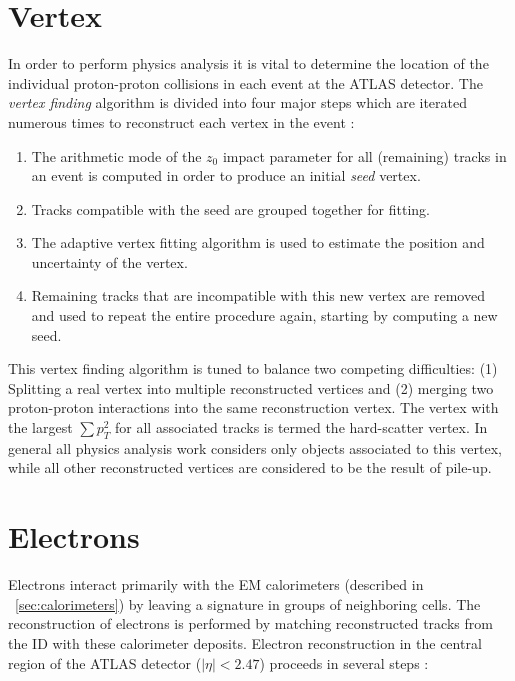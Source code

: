 \section{Vertex}
In order to perform physics analysis it is vital to determine the location of the individual proton-proton collisions in each event at the ATLAS detector.
The \textit{vertex finding} algorithm is divided into four major steps which are iterated numerous times to reconstruct each vertex in the event  \cite{Borissov:2015djv}:
\begin{enumerate}
    \item 
        The arithmetic mode of the $z_0$ impact parameter for all (remaining) tracks in an event is computed in order to produce an initial \textit{seed} vertex.
    \item 
        Tracks compatible with the seed are grouped together for fitting.
    \item 
        The adaptive vertex fitting algorithm is used to estimate the position and uncertainty of the vertex.
    \item
        Remaining tracks that are incompatible with this new vertex are removed and used to repeat the entire procedure again, starting by computing a new seed.
\end{enumerate}
This vertex finding algorithm is tuned to balance two competing difficulties: (1) Splitting a real vertex into multiple reconstructed vertices and (2) merging two proton-proton interactions into the same reconstruction vertex. 
The vertex with the largest $\sum p_T^2$ for all associated tracks is termed the hard-scatter vertex. In general all physics analysis work considers only objects associated to this vertex, while all other reconstructed vertices are considered to be the result of pile-up.

\section{Electrons}
Electrons interact primarily with the EM calorimeters (described in ~\ref{sec:calorimeters}) by leaving a signature in groups of neighboring cells.
The reconstruction of electrons is performed by matching reconstructed tracks from the ID with these calorimeter deposits.
Electron reconstruction in the central region of the ATLAS detector ($|\eta| < 2.47$) proceeds in several steps \cite{ATLAS-CONF-2016-024}:

